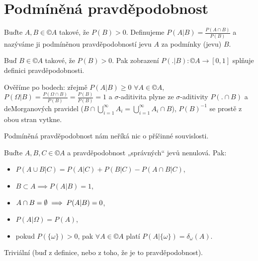 \documentclass[12pt]{article}					%
\begin{document}
\section{Podmíněná pravděpodobnost}
\begin{definice}
	Buďte $A, B \in ©A$ takové, že $P(B) > 0$. Definujeme $P(A|B) = \frac{P(A \cap B)}{P(B)}$ a nazýváme ji podmíněnou pravděpodobností jevu $A$ za podmínky (jevu) $B$.
\end{definice}

\begin{veta}
	Buď $B \in ©A$ takové, že $P(B) > 0$. Pak zobrazení $P(.|B): ©A \rightarrow [0, 1]$ splňuje definici pravděpodobnosti.

	\begin{dukazin}
		Ověříme po bodech: zřejmě $P(A|B) ≥ 0$ $\forall A \in ©A$, $P(\Omega|B) = \frac{P(\Omega \cap B)}{P(B)} = \frac{P(B)}{P(B)} = 1$ a $\sigma$-aditivita plyne ze $\sigma$-aditivity $P(. \cap B)$ a deMorganových pravidel ($B \cap \bigcup_{i=1}^∞ A_i = \bigcup_{i=1}^∞ A_i \cap B$), $P(B)^{-1}$ se prostě z obou stran vytkne.
	\end{dukazin}
\end{veta}

\begin{upozorneni}
	Podmíněná pravděpodobnost nám neříká nic o příčinné souvislosti.
\end{upozorneni}

\begin{pozorovani}
	Buďte $A, B, C \in ©A$ a pravděpodobnost „správných“ jevů nenulová. Pak:
	
	\begin{itemize}
		\item $P(A \cup B | C) = P(A|C) + P(B|C) - P(A \cap B|C)$,
		\item $B \subset A \implies P(A|B) = 1$,
		\item $A \cap B = \emptyset \implies P(A|B) = 0$,
		\item $P(A | \Omega) = P(A)$,
		\item pokud $P(\{\omega\}) > 0$, pak $\forall A \in ©A$ platí $P(A|\{\omega\}) = \delta_{\omega}(A)$.
	\end{itemize}

	\begin{dukazin}
		Triviální (buď z definice, nebo z toho, že je to pravděpodobnost).
	\end{dukazin}
\end{pozorovani}
\end{document}
